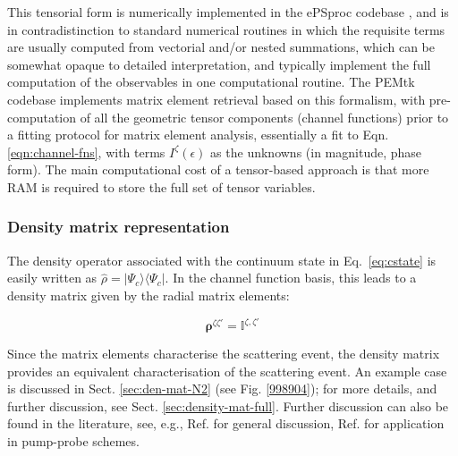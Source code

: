 \documentclass[10pt]{article}
\begin{document}
This tensorial form is numerically implemented in the ePSproc codebase \cite{ePSprocGithub}, and is in contradistinction to standard numerical routines in which the requisite terms are usually computed from vectorial and/or nested summations, which can be somewhat opaque to detailed interpretation, and typically implement the full computation of the observables in one computational routine. The PEMtk codebase \cite{hockett2021PEMtkGithub} implements matrix element retrieval based on this formalism, with pre-computation of all the geometric tensor components (channel functions) prior to a fitting protocol for matrix element analysis, essentially a fit to Eqn. \ref{eqn:channel-fns}, with terms $I^{\zeta}(\epsilon)$ as the unknowns (in magnitude, phase form). The main computational cost of a tensor-based approach is that more RAM is required to store the full set of tensor variables.

\subsubsection{Density matrix representation\label{sec:density-mat-basic}}
The density operator associated with the continuum state in Eq.~\ref{eq:cstate} is easily written as $\hat{\rho}=|\Psi_c\rangle\langle\Psi_c|$. In the channel function basis, this leads to a density matrix given by the radial matrix elements:

\begin{equation}
\mathbf{\rho}^{\zeta\zeta'} = \mathbb{I}^{\zeta,\zeta'}
\label{eqn:radial-density-mat}
\end{equation}

Since the matrix elements characterise the scattering event, the density matrix provides an equivalent characterisation of the scattering event.
An example case is discussed in Sect. \ref{sec:den-mat-N2} (see Fig. \ref{998904}); for more details, and further discussion, see Sect. \ref{sec:density-mat-full}. Further discussion can also be found in the literature, see, e.g., Ref. \cite{BlumDensityMat} for general discussion, Ref. \cite{Reid1991} for application in pump-probe schemes.

\end{document}
